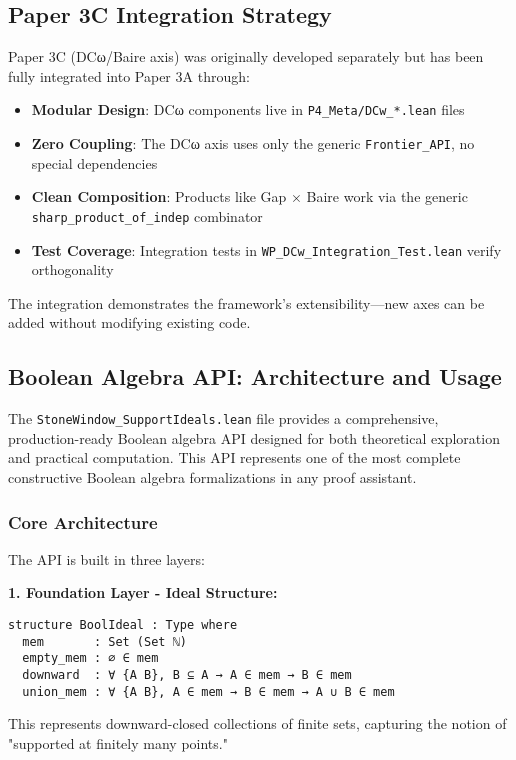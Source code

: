 \documentclass[11pt]{article}
\theoremstyle{plain}
\theoremstyle{definition}
\begin{document}
\subsection{Paper 3C Integration Strategy}

Paper 3C (DCω/Baire axis) was originally developed separately but has been fully integrated into Paper 3A through:
\begin{itemize}
\item \textbf{Modular Design}: DCω components live in \texttt{P4\_Meta/DCw\_*.lean} files
\item \textbf{Zero Coupling}: The DCω axis uses only the generic \texttt{Frontier\_API}, no special dependencies
\item \textbf{Clean Composition}: Products like Gap $\times$ Baire work via the generic \texttt{sharp\_product\_of\_indep} combinator
\item \textbf{Test Coverage}: Integration tests in \texttt{WP\_DCw\_Integration\_Test.lean} verify orthogonality
\end{itemize}

The integration demonstrates the framework's extensibility—new axes can be added without modifying existing code.

\subsection{Boolean Algebra API: Architecture and Usage}

The \texttt{StoneWindow\_SupportIdeals.lean} file provides a comprehensive, production-ready Boolean algebra API designed for both theoretical exploration and practical computation. This API represents one of the most complete constructive Boolean algebra formalizations in any proof assistant.

\subsubsection{Core Architecture}

The API is built in three layers:

\textbf{1. Foundation Layer - Ideal Structure:}
\begin{verbatim}
structure BoolIdeal : Type where
  mem       : Set (Set ℕ)
  empty_mem : ∅ ∈ mem
  downward  : ∀ {A B}, B ⊆ A → A ∈ mem → B ∈ mem
  union_mem : ∀ {A B}, A ∈ mem → B ∈ mem → A ∪ B ∈ mem
\end{verbatim}

This represents downward-closed collections of finite sets, capturing the notion of "supported at finitely many points."
\end{document}
